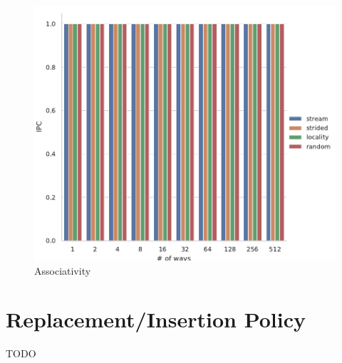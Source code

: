 \documentclass[a4paper]{article}
\begin{document}
\begin{figure}
    \centering
    \includegraphics[width=\textwidth]{ways}
    \caption{Associativity}
    \label{fig:ways}
\end{figure}

\section*{Replacement/Insertion Policy}
TODO
\end{document}
